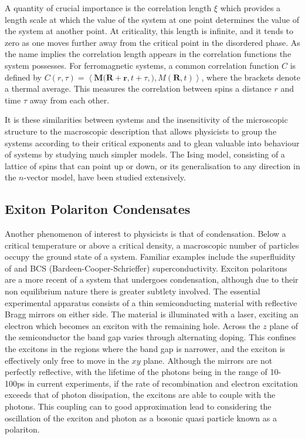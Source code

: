 \documentclass[letterpaper, 10 pt, conference]{IEEEtran}  %
\newcommand{\mean}[1]{\left < #1 \right >}
\newcommand{\myvec}[1]{\boldsymbol{#1}}
\begin{document}
A quantity of crucial importance is the correlation length $\xi$ which provides a length scale at which the value of the system at one point determines the value of the system at another point. 
At criticality, this length is infinite, and it tends to zero as one moves further away from the critical point in the disordered phase. As the name implies the correlation length appears in the correlation functions the system possesses. 
For ferromagnetic systems, a common correlation function $C$ is defined by $C(r,\tau) = \mean{\myvec{M}(\myvec{R} + \myvec{r}, t+\tau,\myvec),{M}(\myvec{R}, t)}$, where the brackets denote a thermal average. 
This measures the correlation between spins a distance $r$ and time $\tau$ away from each other. 

It is these similarities between systems and the insensitivity of the microscopic structure to the  macroscopic description that allows physicists to group the systems according to their critical exponents and to glean valuable into behaviour of systems by studying much simpler models.
The Ising model, consisting of a lattice of spins that can point up or down, or its generalisation to any direction in the $n$-vector model, have been studied extensively.  
 
\subsection{Exiton Polariton Condensates}

Another phenomenon of interest to physicists is that of condensation. 
Below a critical temperature or above a critical density, a macroscopic number of particles occupy the ground state of a system. 
Familiar examples include the superfluidity of  and BCS (Bardeen-Cooper-Schrieffer) superconductivity.
Exciton polaritons are a more recent of a system that undergoes condensation, although due to their non equilibrium nature there is greater subtlety involved.  
The essential experimental apparatus consists of a thin semiconducting material with reflective Bragg mirrors on either side. 
The material is illuminated with a laser, exciting an electron which becomes an exciton with the remaining hole. 
Across the $z$ plane of the semiconductor the band gap varies through alternating doping. 
This confines the excitons in the regions where the band gap is narrower, and the exciton is effectively only free to move in the $xy$ plane.
Although the mirrors are not perfectly reflective, with the lifetime of the photons being in the range of 10-100ps in current experiments, if the rate of recombination and electron excitation exceeds that of photon dissipation, the excitons are able to couple with the photons. 
This coupling can to good approximation lead to considering the oscillation of the exciton and photon as a bosonic quasi particle known as a polariton.    
 
\end{document}
